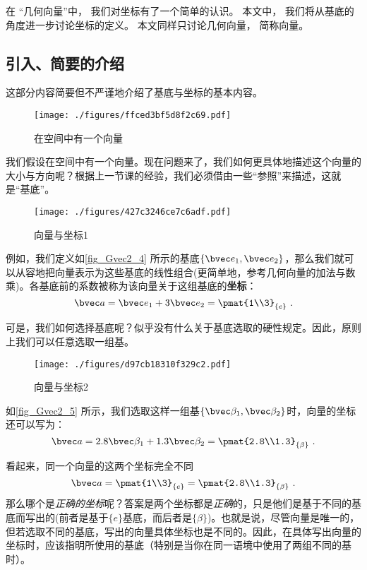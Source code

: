 

在 “几何向量”中， 我们对坐标有了一个简单的认识。 本文中， 我们将从基底的角度进一步讨论坐标的定义。 本文同样只讨论几何向量， 简称向量。

\subsection{引入、简要的介绍}
这部分内容简要但不严谨地介绍了基底与坐标的基本内容。
\begin{figure}[ht]
\centering
\texttt{[image: ./figures/ffced3bf5d8f2c69.pdf]}
\caption{在空间中有一个向量} \label{fig_Gvec2_3}
\end{figure}

我们假设在空间中有一个向量。现在问题来了，我们如何更具体地描述这个向量的大小与方向呢？根据上一节课的经验，我们必须借由一些“参照”来描述，这就是“基底”。

\begin{figure}[ht]
\centering
\texttt{[image: ./figures/427c3246ce7c6adf.pdf]}
\caption{向量与坐标1} \label{fig_Gvec2_4}
\end{figure}
例如，我们定义如\autoref{fig_Gvec2_4} 所示的基底$\{\bvec e_1,\bvec e_2\}$，那么我们就可以从容地把向量表示为这些基底的线性组合(更简单地，参考几何向量的加法与数乘)。各基底前的系数被称为该向量关于这组基底的\textbf{坐标}：
$$\bvec a = \bvec e_1 + 3\bvec e_2=
\pmat{1\\3}_{\{e\}}~.$$

可是，我们如何选择基底呢？似乎没有什么关于基底选取的硬性规定。因此，原则上我们可以任意选取一组基。
\begin{figure}[ht]
\centering
\texttt{[image: ./figures/d97cb18310f329c2.pdf]}
\caption{向量与坐标2} \label{fig_Gvec2_5}
\end{figure}
如\autoref{fig_Gvec2_5} 所示，我们选取这样一组基$\{\bvec \beta_1,\bvec \beta_2\}$时，向量的坐标还可以写为：
$$\bvec a = 2.8 \bvec \beta_1 + 1.3 \bvec \beta_2=
\pmat{2.8\\1.3}_{\{\beta\}}~.$$

看起来，同一个向量的这两个坐标完全不同
$$\bvec a = \pmat{1\\3}_{\{e\}} =
\pmat{2.8\\1.3}_{\{\beta\}}~.$$
那么哪个是\textsl{正确的坐标}呢？答案是两个坐标都是\textsl{正确}的，只是他们是基于不同的基底而写出的(前者是基于$\{e\}$基底，而后者是$\{\beta\}$)。也就是说，尽管向量是唯一的，但若选取不同的基底，写出的向量具体坐标也是不同的。因此，在具体写出向量的坐标时，应该指明所使用的基底（特别是当你在同一语境中使用了两组不同的基时）。


